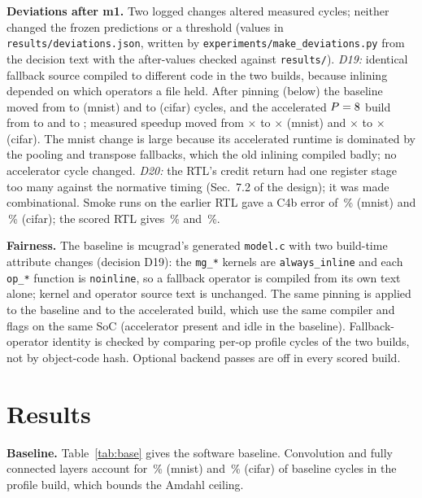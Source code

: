 \documentclass[conference]{IEEEtran}
\begin{document}
\textbf{Deviations after m1.} Two logged changes altered measured cycles; neither changed the frozen predictions or a threshold (values in \texttt{results/deviations.json}, written by \texttt{experiments/make\_deviations.py} from the decision text with the after-values checked against \texttt{results/}). \emph{D19:} identical fallback source compiled to different code in the two builds, because inlining depended on which operators a file held. After pinning (below) the baseline moved from \DevBaseBeforeMnist{} to \BaselineCyclesMnist{} (mnist) and \DevBaseBeforeCifar{} to \BaselineCyclesCifar{} (cifar) cycles, and the accelerated $P=8$ build from \DevAccelBeforeMnist{} to \MeasCyclesMnistPeight{} and \DevAccelBeforeCifar{} to \MeasCyclesCifarPeight{}; measured speedup moved from \DevSpeedupBeforeMnist$\times$ to \DevSpeedupAfterMnist$\times$ (mnist) and \DevSpeedupBeforeCifar$\times$ to \DevSpeedupAfterCifar$\times$ (cifar). The mnist change is large because its accelerated runtime is dominated by the pooling and transpose fallbacks, which the old inlining compiled badly; no accelerator cycle changed. \emph{D20:} the RTL's credit return had one register stage too many against the normative timing (Sec.~7.2 of the design); it was made combinational. Smoke runs on the earlier RTL gave a C4b error of \DevCfourBErrBeforeMnist\,\% (mnist) and \DevCfourBErrBeforeCifar\,\% (cifar); the scored RTL gives \DevCfourBErrAfterMnist\,\% and \DevCfourBErrAfterCifar\,\%.

\textbf{Fairness.} The baseline is mcugrad's generated \texttt{model.c} with two build-time attribute changes (decision D19): the \texttt{mg\_*} kernels are \texttt{always\_inline} and each \texttt{op\_*} function is \texttt{noinline}, so a fallback operator is compiled from its own text alone; kernel and operator source text is unchanged. The same pinning is applied to the baseline and to the accelerated build, which use the same compiler and flags on the same SoC (accelerator present and idle in the baseline). Fallback-operator identity is checked by comparing per-op profile cycles of the two builds, not by object-code hash. Optional backend passes are off in every scored build.

\section{Results}\label{sec:results}
\textbf{Baseline.} Table~\ref{tab:base} gives the software baseline. Convolution and fully connected layers account for \ProfileAccelShareMnist\,\% (mnist) and \ProfileAccelShareCifar\,\% (cifar) of baseline cycles in the profile build, which bounds the Amdahl ceiling.
\end{document}
